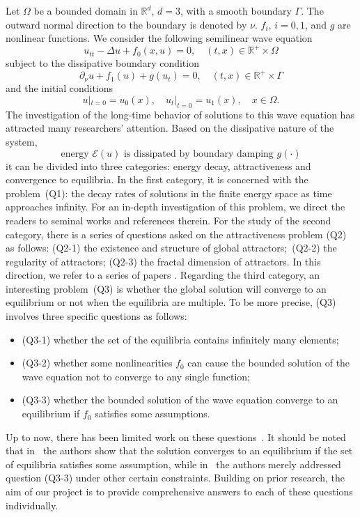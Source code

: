 \documentclass{elsarticle}
\begin{document}
Let $\Omega$ be a bounded domain in $\mathbb{R}^{d}$, $d = 3$, with a smooth boundary $\Gamma$. The outward normal direction to the boundary is denoted by $\nu$. $f_i$, $i=0, 1$, and $g$ are nonlinear functions.
We consider the following semilinear wave equation
\begin{equation}
	u_{tt} - \Delta u +f_0(x, u) = 0, \quad (t, x)\in\mathbb{R}^{+} \times \Omega \label{wave}
\end{equation}
subject to the dissipative boundary condition
\begin{equation}
	\partial_{\nu}u + f_1(u) + g(u_{t})= 0,  \quad (t, x)\in \mathbb{R}^{+} \times \Gamma \label{dynamic_bdry} 
\end{equation}
and the initial conditions
\begin{equation}
	 u|_{t=0} = u_{0}(x),  \quad  u_{t}|_{t=0} = u_{1}(x), \quad x\in \Omega.\label{initial_data} 
\end{equation}
The investigation of the long-time behavior of solutions to this wave equation has attracted many researchers' attention. Based on the dissipative nature of the system,
\[
	\textrm{energy $\mathcal{E}(u)$ is dissipated by boundary damping $g(\cdot)$}
\]
it can be divided into three categories: energy decay, attractiveness and convergence to equilibria.
In the first category, it is concerned with the problem~(Q1): the decay rates of solutions in the finite energy space as time approaches infinity. For an in-depth investigation of this problem, we direct the readers to seminal works \cite{LT1993, CCP2004, CCL2007} and references therein.
For the study of the second category, there is a series of questions asked on the attractiveness problem (Q2) as follows: (Q2-1) the existence and structure of global attractors;~(Q2-2) the regularity of attractors; (Q2-3) the fractal dimension of attractors. In this direction, we refer to a series of papers \cite{CEL2002, CEL2004, chueshov2009, rodrigues2022, HLY2025}.
Regarding the third category, an interesting problem~(Q3) is whether the global solution will converge to an equilibrium or not when the equilibria are multiple. To be more precise, (Q3) involves three specific questions as follows:
\begin{itemize}
	\item (Q3-1) whether the set of the equilibria contains infinitely many elements; 
	\item (Q3-2) whether some nonlinearities $f_0$ can cause the bounded solution of the wave equation not to converge to any single function;
	\item (Q3-3) whether the bounded solution of the wave equation converge to an equilibrium if $f_0$ satisfies some assumptions.
\end{itemize}
Up to now, there has been limited work on these questions~\cite{CEL2002, chueshov2004, Hao2006, Jiao2018}. It should be noted that in~\cite{CEL2002, chueshov2004} the authors show that the solution converges to an equilibrium if the set of equilibria satisfies some assumption, while in~\cite{Hao2006, Jiao2018} the authors merely addressed question (Q3-3) under other certain constraints. Building on prior research, the aim of our project is to provide comprehensive answers to each of these questions individually.
\end{document}
